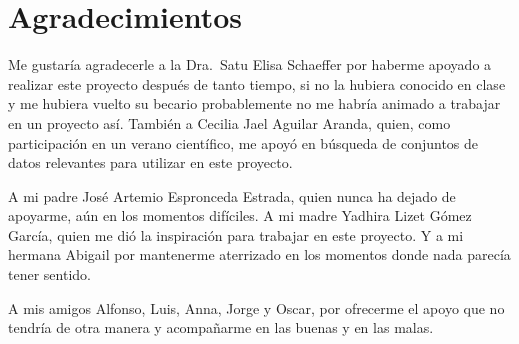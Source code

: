 
\chapter{Agradecimientos}

Me gustaría agradecerle a la Dra.\ Satu Elisa Schaeffer por haberme apoyado a realizar este proyecto después de tanto tiempo, si no la hubiera conocido en clase y me hubiera vuelto su becario probablemente no me habría animado a trabajar en un proyecto así. También a Cecilia Jael Aguilar Aranda, quien, como participación en un verano científico, me apoyó en búsqueda de conjuntos de datos relevantes para utilizar en este proyecto.

A mi padre José Artemio Espronceda Estrada, quien nunca ha dejado de apoyarme, aún en los momentos difíciles. A mi madre Yadhira Lizet Gómez García, quien me dió la inspiración para trabajar en este proyecto. Y a mi hermana Abigail por mantenerme aterrizado en los momentos donde nada parecía tener sentido.

A mis amigos Alfonso, Luis, Anna, Jorge y Oscar, por ofrecerme el apoyo que no tendría de otra manera y acompañarme en las buenas y en las malas.